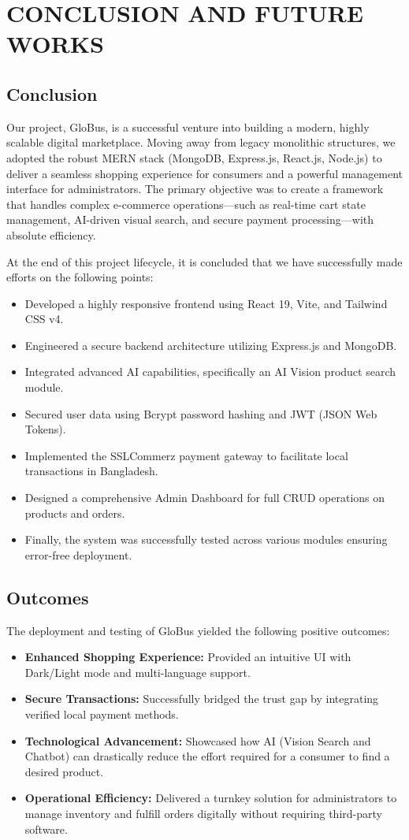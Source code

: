\chapter{CONCLUSION AND FUTURE WORKS}
\section{Conclusion}
Our project, GloBus, is a successful venture into building a modern, highly scalable digital marketplace. Moving away from legacy monolithic structures, we adopted the robust MERN stack (MongoDB, Express.js, React.js, Node.js) to deliver a seamless shopping experience for consumers and a powerful management interface for administrators. The primary objective was to create a framework that handles complex e-commerce operations—such as real-time cart state management, AI-driven visual search, and secure payment processing—with absolute efficiency.

At the end of this project lifecycle, it is concluded that we have successfully made efforts on the following points:
\begin{itemize}
    \item Developed a highly responsive frontend using React 19, Vite, and Tailwind CSS v4.
    \item Engineered a secure backend architecture utilizing Express.js and MongoDB.
    \item Integrated advanced AI capabilities, specifically an AI Vision product search module.
    \item Secured user data using Bcrypt password hashing and JWT (JSON Web Tokens).
    \item Implemented the SSLCommerz payment gateway to facilitate local transactions in Bangladesh.
    \item Designed a comprehensive Admin Dashboard for full CRUD operations on products and orders.
    \item Finally, the system was successfully tested across various modules ensuring error-free deployment.
\end{itemize}

\section{Outcomes}
The deployment and testing of GloBus yielded the following positive outcomes:
\begin{itemize}
    \item \textbf{Enhanced Shopping Experience:} Provided an intuitive UI with Dark/Light mode and multi-language support.
    \item \textbf{Secure Transactions:} Successfully bridged the trust gap by integrating verified local payment methods.
    \item \textbf{Technological Advancement:} Showcased how AI (Vision Search and Chatbot) can drastically reduce the effort required for a consumer to find a desired product.
    \item \textbf{Operational Efficiency:} Delivered a turnkey solution for administrators to manage inventory and fulfill orders digitally without requiring third-party software.
\end{itemize}

